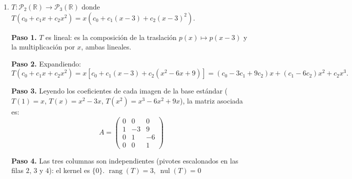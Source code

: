 \begin{prob}
\begin{enumerate}[$a)$]
\begin{myproof}
\textbf{Paso 2.} En la base estándar:
\[
T(1) = 1, \quad T(x) = 1 - 2x, \quad T(x^2) = -3x,
\]
la matriz asociada es:
\[
A = \begin{pmatrix}
1 & 1 & 0 \\
0 & -2 & -3
\end{pmatrix}
\]

\textbf{Paso 3.} Para el kernel: $a_0 + a_1 = 0$ y $-2a_1 - 3a_2 = 0$. Con $a_2 = 2$: $a_1 = -3$, $a_0 = 3$, así que $\ker(T) = \text{span}\{3 - 3x + 2x^2\}$.

\textbf{Paso 4.} Las dos filas de $A$ son independientes, la imagen es todo $\mathcal{P}_1(\mathbb{R})$. $\boxed{\operatorname{rang}(T)=2,\ \operatorname{nul}(T)=1}$
\end{myproof}

\item $T:\mathcal{P}_{2}(\mathbb{R}) \rightarrow \mathcal{P}_{3}(\mathbb{R})$ donde $T(c_0+c_1x+c_2x^2)=x(c_0+c_1(x-3)+c_2(x-3)^2).$
\begin{myproof}
\textbf{Paso 1.} $T$ es lineal: es la composición de la traslación $p(x) \mapsto p(x-3)$ y la multiplicación por $x$, ambas lineales.

\textbf{Paso 2.} Expandiendo:
\[
T(c_0+c_1x+c_2x^2) = x\left[c_0 + c_1(x-3) + c_2(x^2 - 6x + 9)\right]
= (c_0 - 3c_1 + 9c_2)x + (c_1 - 6c_2)x^2 + c_2 x^3.
\]

\textbf{Paso 3.} Leyendo los coeficientes de cada imagen de la base estándar ($T(1) = x$, $T(x) = x^2 - 3x$, $T(x^2) = x^3 - 6x^2 + 9x$), la matriz asociada es:
\[
A = \begin{pmatrix}
0 & 0 & 0 \\
1 & -3 & 9 \\
0 & 1 & -6 \\
0 & 0 & 1
\end{pmatrix}
\]

\textbf{Paso 4.} Las tres columnas son independientes (pivotes escalonados en las filas $2$, $3$ y $4$): el kernel es $\{0\}$. $\boxed{\operatorname{rang}(T)=3,\ \operatorname{nul}(T)=0}$
\end{myproof}

\end{enumerate}
\end{prob}

